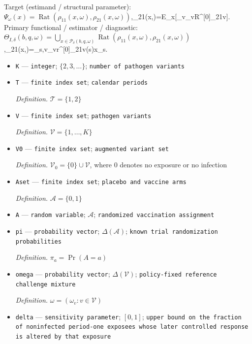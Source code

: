 \documentclass{article}
\begin{document}
Target (estimand / structural parameter): \(\Psi_\omega(x)=\operatorname{Rat}(\rho_{11}(x,\omega),\rho_{21}(x,\omega))\),\quad \rho\_{21}(x,\omega)=\mathbb E\_x[\sum\_v\omega\_vR\textasciicircum{}{[0]}\_{21v}]\).
Primary functional / estimator / diagnostic: \(\Theta_{I,\delta}(b,q,\omega)=\bigcup_{x\in\mathcal P_\delta(b,q,\omega)}\operatorname{Rat}(\rho_{11}(x,\omega),\rho_{21}(x,\omega))\),\quad \rho\_{21}(x,\omega)=\sum\_{s,v}\omega\_vr\textasciicircum{}{[0]}\_{21v}(s)x\_s\).
\begin{itemize}
  \item \texttt{K} --- \texttt{integer}; \(\{2,3,\ldots\}\); \texttt{number of pathogen variants}
  \item \texttt{T} --- \texttt{finite index set}; \texttt{calendar periods}
  \par\smallskip\noindent\emph{Definition.} \(\mathcal T=\{1,2\}\)
  \item \texttt{V} --- \texttt{finite index set}; \texttt{pathogen variants}
  \par\smallskip\noindent\emph{Definition.} \(\mathcal V=\{1,\ldots,K\}\)
  \item \texttt{V0} --- \texttt{finite index set}; \texttt{augmented variant set}
  \par\smallskip\noindent\emph{Definition.} \(\mathcal V_0=\{0\}\cup\mathcal V\), where \(0\) denotes no exposure or no infection
  \item \texttt{Aset} --- \texttt{finite index set}; \texttt{placebo and vaccine arms}
  \par\smallskip\noindent\emph{Definition.} \(\mathcal A=\{0,1\}\)
  \item \texttt{A} --- \texttt{random variable}; \(\mathcal A\); \texttt{randomized vaccination assignment}
  \item \texttt{pi} --- \texttt{probability vector}; \(\Delta(\mathcal A)\); \texttt{known trial randomization probabilities}
  \par\smallskip\noindent\emph{Definition.} \(\pi_a=\Pr(A=a)\)
  \item \texttt{omega} --- \texttt{probability vector}; \(\Delta(\mathcal V)\); \texttt{policy-\allowbreak{}fixed reference challenge mixture}
  \par\smallskip\noindent\emph{Definition.} \(\omega=(\omega_v:v\in\mathcal V)\)
  \item \texttt{delta} --- \texttt{sensitivity parameter}; \([0,1]\); \texttt{upper bound on the fraction of noninfected period-\allowbreak{}one exposees whose later controlled response is altered by that exposure}

\end{itemize}
\end{document}
